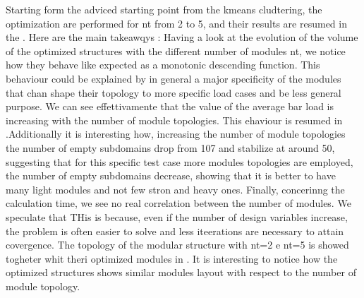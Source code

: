 Starting form the adviced starting point from the kmeans cludtering, the optimization are performed for nt from 2 to 5, and their results are resumed in the . Here are the main takeawqys :  Having a look at the evolution of the volume of the optimized structures with the different number of modules nt, we notice how they behave like expected as a monotonic descending function. This behaviour could be explained by in general a major specificity of the modules that chan shape their topology to more specific load cases and be less general purpose. We can see effettivamente that the value of the average bar load is increasing with the number of module topologies. This ehaviour is resumed in .Additionally it is interesting how, increasing the number of module topologies the number of empty subdomains drop from 107 and stabilize at around 50, suggesting that for this specific test case more modules topologies are employed, the number of empty subdomains decrease, showing that it is better to have many light modules and not few stron and heavy ones. Finally, concerinng the calculation time, we see no real correlation between the number of modules. We speculate that THis is because, even if the number of design variables increase, the problem is often easier  to solve and less iteerations are necessary to attain covergence. The topology of the modular structure with nt=2 e nt=5 is showed togheter whit theri optimized modules in . It is interesting to notice how the optimized structures shows similar modules layout with respect to the number of module topology.

    \begin{figure}
        \hfill
        \caption{}
        \label{fig:06_diferent_modules_cant_topology}
    \end{figure}



